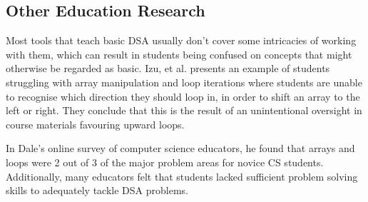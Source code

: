 \documentclass[10pt]{article}
\begin{document}
\subsection{Other Education Research}
Most tools that teach basic DSA usually don't cover some intricacies of working with them, which can result in students being confused on concepts that might otherwise be regarded as basic. Izu, et al.\cite{izuloop} presents an example of students struggling with array manipulation and loop iterations where students are unable to recognise which direction they should loop in, in order to shift an array to the left or right. They conclude that this is the result of an unintentional oversight in course materials favouring upward loops.\par
In Dale's online survey of computer science educators, he found that arrays and loops were 2 out of 3 of the major problem areas for novice CS students\cite{Dale:2006:MDT:1138403.1138432}. Additionally, many educators felt that students lacked sufficient problem solving skills to adequately tackle DSA problems.
\end{document}
